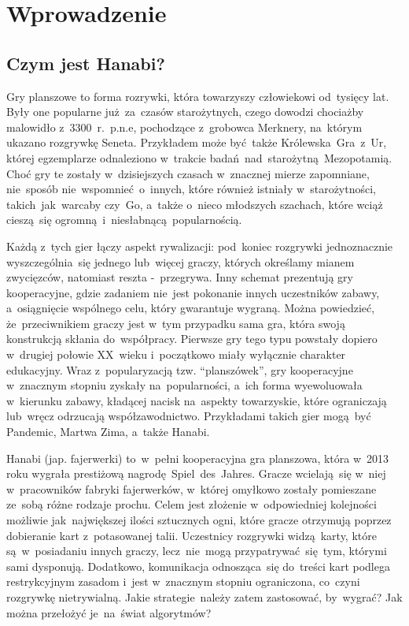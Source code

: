 \documentclass[declaration,shortabstract,inz]{iithesis}
\author         {Wojciech Jarząbek \and
				Jacek Leja}
\date          {\today}                     %
\begin{document}
\chapter{Wprowadzenie}

\section{Czym jest Hanabi?}

Gry planszowe to forma rozrywki, która towarzyszy człowiekowi od~tysięcy lat. Były one popularne już za~czasów starożytnych, czego dowodzi chociażby malowidło z~3300~r.~p.n.e, pochodzące z~grobowca Merknery, na~którym ukazano rozgrywkę Seneta. Przykładem może być także Królewska~Gra~z~Ur, której egzemplarze odnaleziono w~trakcie badań nad~starożytną Mezopotamią. Choć gry te zostały w~dzisiejszych czasach w~znacznej mierze zapomniane, nie~sposób nie~wspomnieć o~innych, które również istniały w~starożytności, takich~jak~warcaby czy~Go, a~także o~nieco młodszych szachach, które wciąż cieszą~się ogromną i~niesłabnącą popularnością.

Każdą z~tych gier łączy aspekt rywalizacji: pod~koniec rozgrywki jednoznacznie wyszczególnia~się jednego lub~więcej graczy, których określamy mianem zwycięzców, natomiast reszta -~przegrywa. Inny schemat prezentują gry kooperacyjne, gdzie zadaniem nie~jest pokonanie innych uczestników zabawy, a~osiągnięcie wspólnego celu, który gwarantuje wygraną. Można powiedzieć, że~przeciwnikiem graczy jest w~tym przypadku sama gra, która swoją konstrukcją skłania do~współpracy. Pierwsze gry tego typu powstały dopiero w~drugiej połowie XX~wieku i~początkowo miały wyłącznie charakter edukacyjny. Wraz z~popularyzacją tzw. ``planszówek'', gry kooperacyjne w~znacznym stopniu zyskały na~popularności, a~ich forma wyewoluowała w~kierunku zabawy, kładącej nacisk na~aspekty towarzyskie, które ograniczają lub~wręcz odrzucają współzawodnictwo. Przykładami takich gier mogą~być Pandemic, Martwa Zima, a~także Hanabi.

Hanabi (jap. fajerwerki) to~w~pełni kooperacyjna gra planszowa, która w~2013 roku wygrała prestiżową nagrodę Spiel~des~Jahres. Gracze wcielają~się w~niej w~pracowników fabryki fajerwerków, w~której omyłkowo zostały pomieszane ze~sobą różne rodzaje prochu. Celem jest złożenie w~odpowiedniej kolejności możliwie jak~największej ilości sztucznych ogni, które gracze otrzymują poprzez dobieranie kart z~potasowanej talii. Uczestnicy rozgrywki widzą karty, które są~w~posiadaniu innych graczy, lecz~nie~mogą przypatrywać~się~tym, którymi sami dysponują. Dodatkowo, komunikacja odnosząca~się do~treści kart podlega restrykcyjnym zasadom i~jest w~znacznym stopniu ograniczona, co~czyni rozgrywkę nietrywialną. Jakie strategie należy zatem zastosować, by~wygrać? Jak można przełożyć je~na~świat algorytmów?
\end{document}
